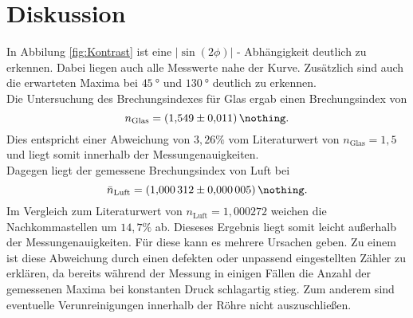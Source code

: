\FloatBarrier
\newpage
\section{Diskussion}
In Abbilung \ref{fig:Kontrast} ist eine $|\sin{(2\phi)}|$ - Abhängigkeit deutlich zu erkennen.
Dabei liegen auch alle Messwerte nahe der Kurve.
Zusätzlich sind auch die erwarteten Maxima bei $\SI{45}{\degree}$ und $\SI{130}{\degree}$ deutlich zu erkennen. \\
Die Untersuchung des Brechungsindexes für Glas ergab einen Brechungsindex von
\begin{equation}
    n_\text{Glas} = \SI{1.549 \pm 0.011}{\nothing} .
\end{equation}
Dies entspricht einer Abweichung von $3,26 \%$ vom Literaturwert von $n_\text{Glas} = 1,5$ und liegt somit innerhalb der Messungenauigkeiten.  \\
Dagegen liegt der gemessene Brechungsindex von Luft bei
\begin{equation}
    \bar{n}_\text{Luft} = \SI{1.000312 \pm 0.000005}{\nothing} .
 \end{equation}
Im Vergleich  zum Literaturwert von $n_\text{Luft} = 1,000272$ \cite{spektrum} weichen die Nachkommastellen um $14,7 \%$ ab. Dieseses Ergebnis liegt somit leicht außerhalb der Messungenauigkeiten. Für diese kann es mehrere Ursachen geben. Zu einem ist diese Abweichung durch einen defekten oder unpassend eingestellten Zähler zu erklären, da bereits während der Messung in einigen Fällen die Anzahl der gemessenen Maxima bei konstanten Druck schlagartig stieg. Zum anderem sind eventuelle Verunreinigungen innerhalb der Röhre nicht auszuschließen.
